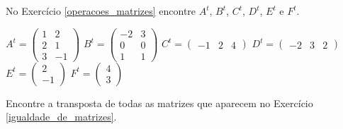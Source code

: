 \documentclass[12pt]{exam}
\begin{document}
\begin{exercicio}
    No Exercício \ref{operacoes_matrizes} encontre $A^t$, $B^t$, $C^t$, $D^t$, $E^t$ e $F^t$.
    \begin{solucao}
        $A^t = \begin{pmatrix}1 & 2\\2 & 1\\3 & -1\end{pmatrix}$
        $B^t = \begin{pmatrix}-2 & 3\\0 & 0\\1 & 1\end{pmatrix}$
        $C^t = \begin{pmatrix}-1 & 2 & 4\end{pmatrix}$
        $D^t = \begin{pmatrix}-2 & 3 & 2\end{pmatrix}$
        $E^t = \begin{pmatrix}2\\ -1\end{pmatrix}$
        $F^t = \begin{pmatrix}4\\3\end{pmatrix}$
    \end{solucao}
\end{exercicio}

\begin{exercicio}
    Encontre a transposta de todas as matrizes que aparecem no Exercício \ref{igualdade_de_matrizes}.
\end{exercicio}
\end{document}
